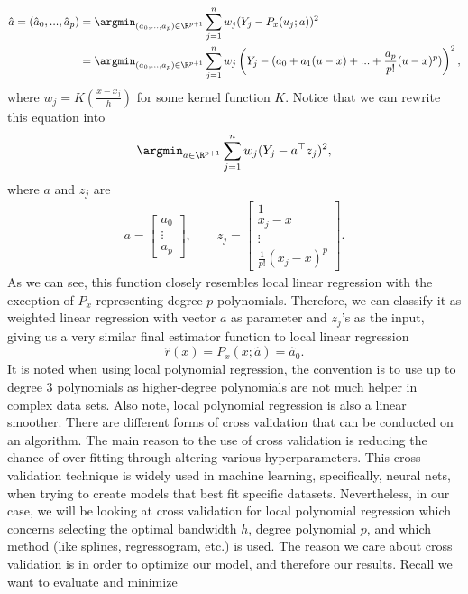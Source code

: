 \begin{align}
    \hat{a} = (\hat{a}_0, ..., \hat{a}_p) &= \argmin_{(a_0,..., a_p) \in \R^{p+1}} \sum_{j=1}^{n}w_j(Y_j - P_x(u_j;a))^2 \nonumber \\
    &= \argmin_{(a_0,..., a_p) \in \R^{p+1}} \sum_{j=1}^{n}w_j\left(Y_j - (a_0 + a_1(u - x) + ... + \frac{a_p}{p!}(u - x)^p)\right)^2,
  \end{align}
where $w_j = K \left(\frac{x-x_j}{h}\right)$ for some kernel function $K$. Notice that we can rewrite this equation into
\begin{align*}
\argmin_{a \in \R^{p+1}} \sum_{j=1}^{n}w_j(Y_j - a^\top z_j)^2, 
\end{align*}
where $a$ and $z_j$ are
\begin{align*}
a = \begin{bmatrix} a_0 \\ \vdots \\a_p \end{bmatrix}, \qquad
z_j = \begin{bmatrix} 1 \\ x_j-x \\ \vdots \\\frac{1}{p!}(x_j-x)^p \end{bmatrix}.
\end{align*}
As we can see, this function closely resembles local linear regression with the exception of $P_x$ representing degree-$p$ polynomials. Therefore, we can classify it as weighted linear regression with vector $a$ as parameter and $z_j$'s as the input, giving us a very similar final estimator function to local linear regression
\[
\hat{r}(x) = P_x(x;\hat{a}) = \hat{a}_0.
\]
It is noted when using local polynomial regression, the convention is to use up to degree 3 polynomials as higher-degree polynomials are not much helper in complex data sets. Also note, local polynomial regression is also a linear smoother.
There are different forms of cross validation that can be conducted on an algorithm. The main reason to the use of cross validation is reducing the chance of over-fitting through altering various hyperparameters. This cross-validation technique is widely used in machine learning, specifically, neural nets, when trying to create models that best fit specific datasets. Nevertheless, in our case, we will be looking at cross validation for local polynomial regression which concerns selecting the optimal bandwidth $h$, degree polynomial $p$, and which method (like splines, regressogram, etc.) is used. The reason we care about cross validation is in order to optimize our model, and therefore our results. Recall we want to evaluate and minimize 
